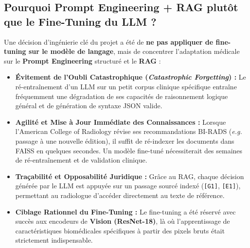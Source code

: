 \documentclass[11pt,a4paper]{article}
\begin{document}
\subsection{Pourquoi Prompt Engineering + RAG plutôt que le Fine-Tuning du LLM ?}
Une d\'ecision d'ing\'enierie cl\'e du projet a \'et\'e de \textbf{ne pas appliquer de fine-tuning sur le modèle de langage}, mais de concentrer l'adaptation m\'edicale sur le \textbf{Prompt Engineering} structur\'e et le \textbf{RAG} :

\begin{itemize}
    \item \textbf{Évitement de l'Oubli Catastrophique (\textit{Catastrophic Forgetting}) :} Le r\'e-entra\^inement d'un LLM sur un petit corpus clinique sp\'ecifique entra\^ine fr\'equemment une d\'egradation de ses capacit\'es de raisonnement logique g\'en\'eral et de g\'en\'eration de syntaxe JSON valide.
    \item \textbf{Agilité et Mise à Jour Immédiate des Connaissances :} Lorsque l'American College of Radiology r\'evise ses recommandations BI-RADS (\textit{e.g.} passage \`a une nouvelle \'edition), il suffit de r\'e-indexer les documents dans FAISS en quelques secondes. Un mod\`ele fine-tun\'e n\'ecessiterait des semaines de r\'e-entra\^inement et de validation clinique.
    \item \textbf{Traçabilité et Opposabilité Juridique :} Gr\^ace au RAG, chaque d\'ecision g\'en\'er\'ee par le LLM est appuy\'ee sur un passage sourc\'e index\'e (\texttt{[G1]}, \texttt{[E1]}), permettant au radiologue d'acc\'eder directement au texte de r\'ef\'erence.
    \item \textbf{Ciblage Rationnel du Fine-Tuning :} Le fine-tuning a \'et\'e r\'eserv\'e avec succ\`es aux encodeurs de \textbf{Vision (ResNet-18)}, l\`a o\`u l'apprentissage de caract\'eristiques biom\'edicales sp\'ecifiques \`a partir des pixels bruts \'etait strictement indispensable.
\end{itemize}
\end{document}
